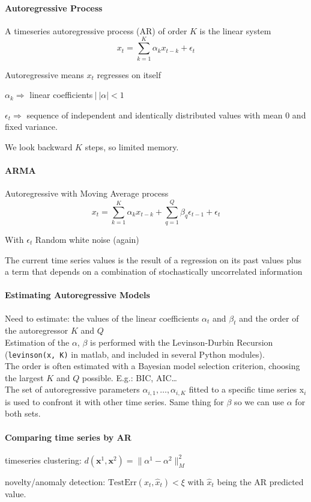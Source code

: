 \documentclass[10pt]{report}
\begin{document}
\paragraph{Autoregressive Process} A timeseries autoregressive process (AR) of order $K$ is the linear system $$x_t = \sum_{k=1}^K \alpha_k x_{t-k} + \epsilon_t$$\begin{list}{}{}
	\item Autoregressive means $x_t$ regresses on itself
	\item $\alpha_k \Rightarrow$ linear coefficients$\:|\:|\alpha|<1$
	\item $\epsilon_t\Rightarrow$ sequence of independent and identically distributed values with mean 0 and fixed variance.
	\item We look backward $K$ steps, so limited memory.
\end{list}
\paragraph{ARMA} Autoregressive with Moving Average process $$x_t = \sum_{k=1}^K \alpha_k x_{t-k} + \sum_{q=1}^Q \beta_q\epsilon_{t-1}+\epsilon_t$$
\begin{list}{}{}
	\item With $\epsilon_t$ Random white noise (again)
	\item The current time series values is the result of a regression on its past values plus a term that depends on a combination of stochastically uncorrelated information
\end{list}
\paragraph{Estimating Autoregressive Models} Need to estimate: the values of the linear coefficients $\alpha_t$ and $\beta_t$ and the order of the autoregressor $K$ and $Q$\\
Estimation of the $\alpha$, $\beta$ is performed with the Levinson-Durbin Recursion (\texttt{levinson(x, K)} in matlab, and included in several Python modules).\\
The order is often estimated with a Bayesian model selection criterion, choosing the largest $K$ and $Q$ possible. E.g.: BIC, AIC\ldots\\
The set of autoregressive parameters $\alpha_{i,1},\ldots,\alpha_{i,K}$ fitted to a specific time series x$_i$ is used to confront it with other time series. Same thing for $\beta$ so we can use $\alpha$ for both sets.
\paragraph{Comparing time series by AR}\begin{list}{}{}
	\item timeseries clustering: $d(\mathbf{x}^1,\mathbf{x}^2)=\|\alpha^1-\alpha^2\|_M^2$
	\item novelty/anomaly detection: $\text{TestErr}(x_t,\hat{x}_t)<\xi$ with $\hat{x}_t$ being the AR predicted value.
\end{list}
\end{document}
